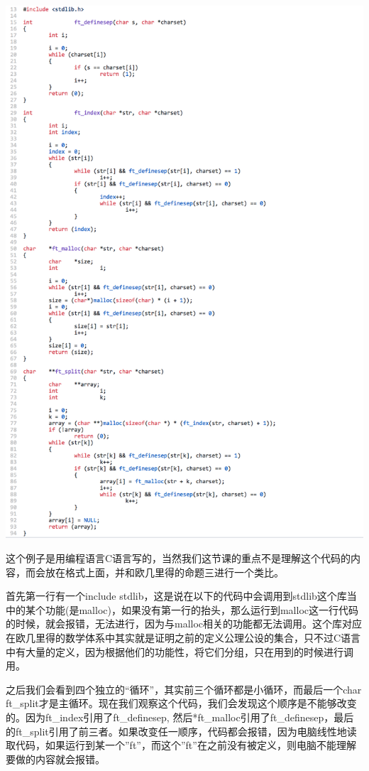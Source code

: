 \documentclass[
]{book}
\begin{document}
\includegraphics[width=1\linewidth]{./image/03-prop3-image3}

这个例子是用编程语言C语言写的，当然我们这节课的重点不是理解这个代码的内容，而会放在格式上面，并和欧几里得的命题三进行一个类比。

首先第一行有一个include stdlib，这是说在以下的代码中会调用到stdlib这个库当中的某个功能(是malloc)，如果没有第一行的抬头，那么运行到malloc这一行代码的时候，就会报错，无法进行，因为与malloc相关的功能都无法调用。这个库对应在欧几里得的数学体系中其实就是证明之前的定义公理公设的集合，只不过C语言中有大量的定义，因为根据他们的功能性，将它们分组，只在用到的时候进行调用。

之后我们会看到四个独立的``循环''，其实前三个循环都是小循环，而最后一个char ft\_split才是主循环。现在我们观察这个代码，我们会发现这个顺序是不能够改变的。因为ft\_index引用了ft\_definesep, 然后*ft\_malloc引用了ft\_definesep，最后的ft\_split引用了前三者。如果改变任一顺序，代码都会报错，因为电脑线性地读取代码，如果运行到某一个''ft''，而这个''ft''在之前没有被定义，则电脑不能理解要做的内容就会报错。
\end{document}
